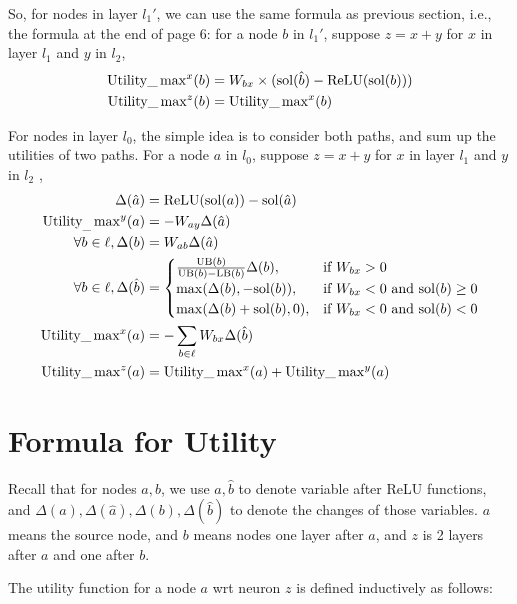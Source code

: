 {So, for nodes in layer $l_1'$, we can use the same formula as previous section, i.e., the formula at the end of page 6: for a node $b$ in $l_1'$, suppose $z=x+y$ for $x$ in layer $l_1$ and $y$ in $l_2$, 
\begin{align*}
\mathrm{Utility}\_\max\nolimits^x(b) &= W_{bx} \times (\mathrm{sol}(\hat{b})- \mathrm{ReLU}(\mathrm{sol}(b)))\\
\mathrm{Utility}\_\max\nolimits^z(b) &= \mathrm{Utility}\_\max\nolimits^x(b)
\end{align*}

For nodes in layer $l_0$, the simple idea is to consider both paths, and sum up the utilities of two paths. For a node $a$ in $l_0$, suppose $z=x+y$ for $x$ in layer $l_1$ and $y$ in $l_2$ ,
\begin{align*}
		\Delta(\hat{a}) &= \mathrm{ReLU}(\mathrm{sol}(a))-\mathrm{sol}(\hat{a})\\
		\mathrm{Utility}_\_\max\nolimits^y(a) &= -W_{ay} \Delta(\hat{a})\\
	\forall b \in \ell, \Delta(b) &= W_{ab}\Delta(\hat{a})\\
	\forall b \in \ell, \Delta(\hat{b}) &=
	\begin{cases}
		\frac{\mathrm{UB}(b)}{\mathrm{UB}(b)-\mathrm{LB}(b)}\Delta(b),  &\text{if }W_{bx} > 0\\
		\max(\Delta(b),-\mathrm{sol}(b)),  &\text{if }  W_{bx} < 0 \text{ and } \mathrm{sol}(b)\geq0\\
		\max(\Delta(b)+\mathrm{sol}(b),0),  &\text{if }  W_{bx} < 0 \text{ and } \mathrm{sol}(b)<0		 
	\end{cases}\\
	\mathrm{Utility}\_\max\nolimits^x(a) &= -\sum_{b \in \ell} W_{bx} \Delta(\hat{b})\\
	\mathrm{Utility}\_\max\nolimits^z(a) &= \mathrm{Utility}\_\max\nolimits^x(a)+\mathrm{Utility}\_\max\nolimits^y(a)
\end{align*}

	
	
		
	


\section{Formula for Utility}


Recall that for nodes $a,b$, we use 
$\hat{a}, \hat{b}$ to denote variable after ReLU functions, and
$\Delta(a),\Delta(\hat{a}),\Delta(b),\Delta(\hat{b})$ to denote the changes of those variables. $a$ means the source node, and $b$ means nodes one layer after $a$, and $z$ is 2 layers after $a$ and one after $b$.

The utility function for a node $a$ wrt neuron $z$ is defined inductively as follows:


}

